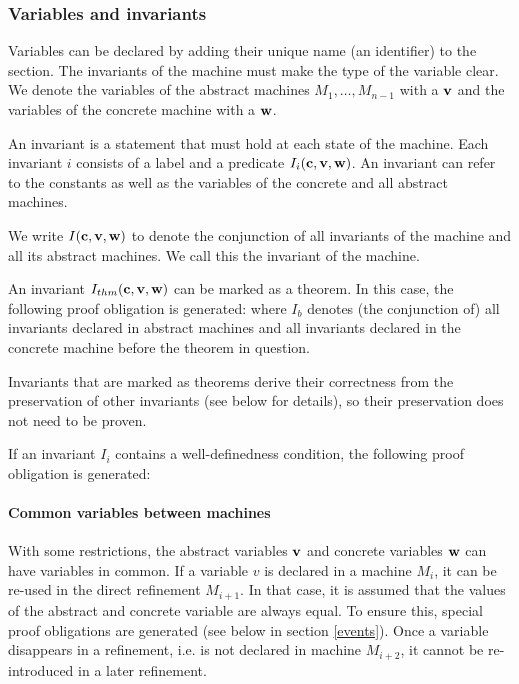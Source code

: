 \subsubsection{Variables and invariants}
Variables can be declared by adding their unique name (an identifier) to the  section. The invariants of the machine must make the type of the variable clear.
We denote the variables of the abstract machines $M_1,\ldots,M_{n-1}$ with a $\textbf{v}$ and the variables of the concrete machine with a $\textbf{w}$.

An invariant is a statement that must hold at each state of the machine.
Each invariant $i$ consists of a label and a predicate $I_i(\textbf{c},\textbf{v},\textbf{w})$.
An invariant can refer to the constants as well as the variables of the concrete and all abstract machines.

We write $I(\textbf{c},\textbf{v},\textbf{w})$ to denote the conjunction of all invariants
of the machine and all its abstract machines. We call this the invariant of the machine.

An invariant $I_{thm}(\textbf{c},\textbf{v},\textbf{w})$ can be marked as a theorem. In this case, the following proof obligation is generated:
where $I_b$ denotes (the conjunction of) all invariants declared in abstract machines and all invariants declared in the concrete machine before
the theorem in question.

Invariants that are marked as theorems derive their correctness from the preservation of other invariants (see below for details), so their preservation does not need to be proven.

If an invariant $I_i$ contains a well-definedness condition, the following proof obligation is generated:

\paragraph{Common variables between machines}
With some restrictions, the abstract variables $\textbf{v}$ and concrete
  variables $\textbf{w}$ can have variables in common.
If a variable $v$ is declared in a machine $M_i$, it can be re-used in the
  direct refinement $M_{i+1}$. 
In that case, it is assumed that the values of the abstract and concrete variable 
  are always equal.
To ensure this, special proof obligations are generated (see below in section \ref{events}).
Once a variable disappears in a refinement, i.e. is not declared in machine $M_{i+2}$,
  it cannot be re-introduced in a later refinement.

